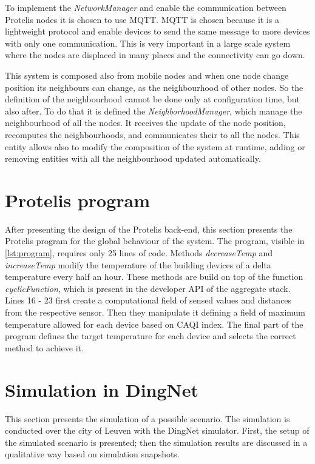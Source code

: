 \noindent To implement the \mbox{\textit{NetworkManager}} and enable the communication between Protelis nodes it is chosen to use MQTT.
MQTT is chosen because it is a lightweight protocol and enable devices to send the same message to more devices with only one communication.
This is very important in a large scale system where the nodes are displaced in many places and the connectivity can go down.

\noindent This system is composed also from mobile nodes and when one node change position its neighbours can change, as the neighbourhood of other nodes. 
So the definition of the neighbourhood cannot be done only at configuration time, but also after.
To do that it is defined the \mbox{\textit{NeighborhoodManager}}, which manage the neighbourhood of all the nodes.
It receives the update of the node position, recomputes the neighbourhoods, and communicates their to all the nodes. 
This entity allows also to modify the composition of the system at runtime, adding or removing entities with all the neighbourhood updated automatically.

\section{Protelis program}
After presenting the design of the Protelis back-end, this section presents the Protelis program for the global behaviour of the system. 
The program, visible in \autoref{lst:program}, requires only 25 lines of code.
Methods \mbox{\textit{decreaseTemp}} and \mbox{\textit{increaseTemp}} modify the temperature of the building devices of a delta temperature every half an hour.
These methods are build on top of the function \mbox{\textit{cyclicFunction}}, which is present in the developer API of the aggregate stack.
Lines 16 - 23 first create a computational field of sensed values and distances from the respective sensor. 
Then they manipulate it defining a field of maximum temperature allowed for each device based on CAQI index.
The final part of the program defines the target temperature for each device and selects the correct method to achieve it. 



\section{Simulation in DingNet}
This section presents the simulation of a possible scenario. 
The simulation is conducted over the city of Leuven with the DingNet simulator.
First, the setup of the simulated scenario is presented; then the simulation results are discussed in a qualitative way based on simulation snapshots.

